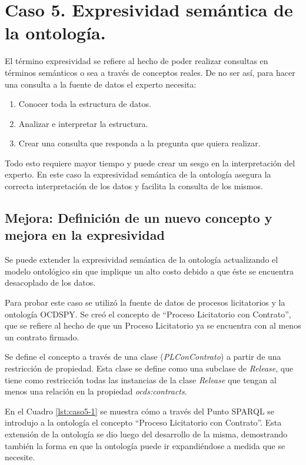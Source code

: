 \section{Caso 5. Expresividad semántica de la ontología. }
\label{section:caso5}

El término expresividad se refiere al hecho de poder realizar consultas en términos semánticos o sea a través de conceptos reales. De no ser así, para hacer una consulta a la fuente de datos el experto necesita:

\begin{enumerate}
    \item Conocer toda la estructura de datos.
    \item Analizar e interpretar la estructura.
    \item Crear una consulta que responda a la pregunta que quiera realizar.
\end{enumerate}

Todo esto requiere mayor tiempo y puede crear un sesgo en la interpretación del experto. En este caso la expresividad semántica de la ontología asegura la correcta interpretación de los datos y facilita la consulta de los mismos.


\subsection{Mejora: Definición de un nuevo concepto y mejora en la expresividad}
Se puede extender la expresividad semántica de la ontología actualizando el modelo ontológico sin que implique un alto costo debido a que éste se encuentra desacoplado de los datos.

Para probar este caso se utilizó la fuente de datos de procesos licitatorios y la ontología OCDSPY.  Se creó el  concepto  de “Proceso Licitatorio con Contrato”, que se refiere al hecho de que un Proceso Licitatorio ya se encuentra con al menos un contrato firmado.

Se define el concepto a través de una clase (\textit{PLConContrato}) a partir de una restricción de propiedad. Esta clase se define como una subclase de \textit{Release}, que tiene como restricción todas las instancias de la clase \textit{Release} que tengan al menos una relación en la propiedad \textit{ocds:contracts}.

En el Cuadro \ref{lst:caso5-1} se muestra cómo a través del Punto SPARQL se introdujo a la ontología el concepto “Proceso Licitatorio con Contrato”. Esta extensión de la ontología se dio luego del desarrollo de la misma, demostrando también la forma en que la ontología puede ir expandiéndose a medida que se necesite.

